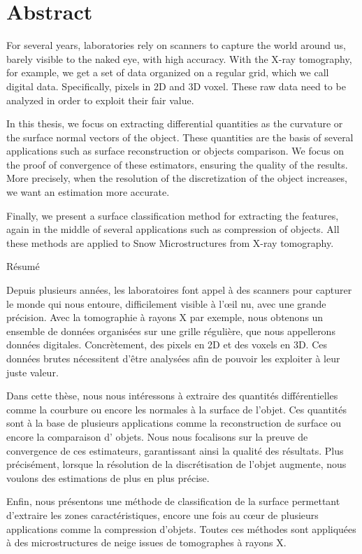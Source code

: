 %
\chapter*{Abstract}
\label{sec:abstract}
\vspace*{-10mm}

For several years, laboratories rely on scanners to capture the world around us,
barely visible to the naked eye, with high accuracy. With the X-ray tomography,
for example, we get a set of data organized on a regular grid, which we call
digital data. Specifically, pixels in 2D and 3D voxel. These raw data need to be
analyzed in order to exploit their fair value.

In this thesis, we focus on extracting differential quantities as the curvature
or the surface normal vectors of the object. These quantities are the basis of
several applications such as surface reconstruction or objects comparison. We
focus on the proof of convergence of these estimators, ensuring the quality of
the results. More precisely, when the resolution of the discretization of the
object increases, we want an estimation more accurate.

Finally, we present a surface classification method for extracting the features,
again in the middle of several applications such as compression of objects. All
these methods are applied to Snow Microstructures from X-ray tomography.

\vspace*{20mm}

{Résumé}
\label{sec:abstract-french}
\vspace*{5mm}

Depuis plusieurs années, les laboratoires font appel à des scanners pour
capturer le monde qui nous entoure, difficilement visible à l'œil nu, avec une
grande précision. Avec la tomographie à rayons X par exemple, nous obtenons un
ensemble de données organisées sur une grille régulière, que nous appellerons
données digitales. Concrètement, des pixels en 2D et des voxels en 3D. Ces
données brutes nécessitent d'être analysées afin de pouvoir les exploiter à leur
juste valeur.

Dans cette thèse, nous nous intéressons à extraire des quantités différentielles
comme la courbure ou encore les normales à la surface de l'objet. Ces quantités
sont à la base de plusieurs applications comme la reconstruction de surface ou
encore la comparaison d' objets. Nous nous focalisons sur la preuve de
convergence de ces estimateurs, garantissant ainsi la qualité des résultats.
Plus précisément, lorsque la résolution de la discrétisation de l'objet
augmente, nous voulons des estimations de plus en plus précise.

Enfin, nous présentons une méthode de classification de la surface permettant
d'extraire les zones caractéristiques, encore une fois au cœur de plusieurs
applications comme la compression d'objets. Toutes ces méthodes sont appliquées à
des microstructures de neige issues de tomographes à rayons X.
